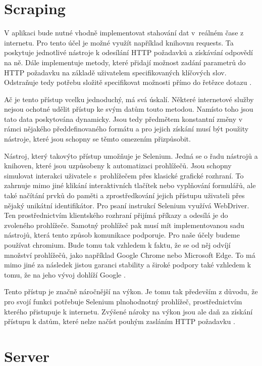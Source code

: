 \section{Scraping}

V aplikaci bude nutné vhodně implementovat stahování dat v~reálném čase z internetu. 
Pro tento účel je možné využít například knihovnu requests. 
Ta poskytuje jednotlivé nástroje k odesílání HTTP požadavků a získávání odpovědí na ně. 
Dále implementuje metody, které přidají možnost zadání parametrů do HTTP požadavku na základě uživatelem specifikovaných klíčových slov. 
Odstraňuje tedy potřebu složitě specifikovat možnosti přímo do řetězce dotazu \cite{req}.

Ač je tento přístup vcelku jednoduchý, má svá úskalí. 
Některé internetové služby nejsou ochotné udělit přístup ke svým datům touto metodou. 
Namísto toho jsou tato data poskytována dynamicky. 
Jsou tedy předmětem konstantní změny v rámci nějakého předdefinovaného formátu a pro jejich získání musí být použity nástroje, které jsou schopny se těmto omezením přizpůsobit.

Nástroj, který takovýto přístup umožňuje je Selenium.
Jedná se o řadu nástrojů a knihoven, které jsou uzpůsobeny k automatizaci prohlížečů. 
Jsou schopny simulovat interakci uživatele s~prohlížečem přes klasické grafické rozhraní. 
To zahrnuje mimo jiné klikání interaktivních tlačítek nebo vyplňování formulářů, ale také načítání prvků do paměti a zprostředkování jejich přístupu uživateli přes nějaký unikátní identifikátor. 
Pro psaní instrukcí Selenium využívá WebDriver. 
Ten prostřednictvím klientského rozhraní přijímá příkazy a odesílá je do zvoleného prohlížeče. 
Samotný prohlížeč pak musí mít implementovanou sadu nástrojů, která tento způsob komunikace podporuje. 
Pro naše účely budeme používat chromium. 
Bude tomu tak vzhledem k faktu, že se od něj odvíjí množství prohlížečů, jako například Google Chrome nebo Microsoft Edge.
To má mimo jiné za následek jistou garanci stability a široké podpory také vzhledem k tomu, že na jeho vývoj dohlíží Google \cite{chromium}.

Tento přístup je značně náročnější na výkon.
Je tomu tak především z důvodu, že pro svojí funkci potřebuje Selenium plnohodnotný prohlížeč, prostřednictvím kterého přistupuje k internetu. 
Zvýšené nároky na výkon jsou ale daň za získání přístupu k datům, které nelze načíst pouhým zasláním HTTP požadavku \cite{selenium}.

\section{Server}

